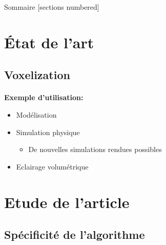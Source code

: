 \titleframe

\begin{frame}{Sommaire}
  [sections numbered]
  \tableofcontents[hideallsubsections]
\end{frame}

\section{État de l'art}

\subsection{Voxelization}

\begin{frame}[fragile=singleslide]{\insertsectionhead}
  \framesubtitle{\insertsubsectionhead}
    \textbf{Exemple d'utilisation:}
    \begin{itemize}
      \item Modélisation
      \item Simulation physique
        \begin{itemize}
          \item De nouvelles simulations rendues possibles
        \end{itemize}
      \item Eclairage volumétrique
    \end{itemize}

\end{frame}

\section{Etude de l'article}

\subsection{Spécificité de l'algorithme}

